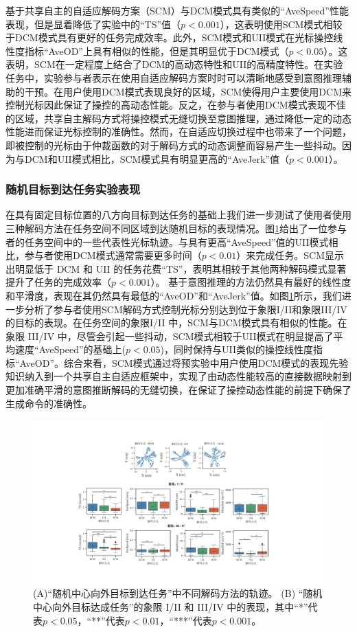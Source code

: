 基于共享自主的自适应解码方案（SCM）与DCM模式具有类似的``AveSpeed''性能表现，但是显着降低了实验中的``TS''值（$p<0.001$），这表明使用SCM模式相较于DCM模式具有更好的任务完成效率。此外，SCM模式和UII模式在光标操控线性度指标``AveOD''上具有相似的性能，但是其明显优于DCM模式（$p<0.05$）。这表明，SCM在一定程度上结合了DCM的高动态特性和UII的高精度特性。在实验任务中，实验参与者表示在使用自适应解码方案时时可以清晰地感受到意图推理辅助的干预。在用户使用DCM模式表现良好的区域，SCM使得用户主要使用DCM来控制光标因此保证了操控的高动态性能。反之，在参与者使用DCM模式表现不佳的区域，共享自主解码方式将操控模式无缝切换至意图推理，通过降低一定的动态性能进而保证光标控制的准确性。然而，在自适应切换过程中也带来了一个问题，即被控制的光标由于仲裁函数的对于解码方式的动态调整而容易产生一些抖动。因为与DCM和UII模式相比，SCM模式具有明显更高的``AveJerk''值（$p<0.001$）。  

\subsubsection{随机目标到达任务实验表现}在具有固定目标位置的八方向目标到达任务的基础上我们进一步测试了使用者使用三种解码方法在任务空间不同区域到达随机目标的表现情况。图\ref{fig:3-14}给出了一位参与者的任务空间中的一些代表性光标轨迹。与具有更高``AveSpeed''值的UII模式相比，参与者使用DCM模式通常需要更多时间（$p<0.01$）来完成任务。SCM显示出明显低于 DCM 和 UII 的任务花费``TS''，表明其相较于其他两种解码模式显著提升了任务的完成效率（$p<0.001$）。 基于意图推理的方法仍然具有最好的线性度和平滑度，表现在其仍然具有最低的``AveOD''和``AveJerk''值。如图\ref{fig:3-14}所示，我们进一步分析了参与者使用SCM解码方式控制光标分别达到位于象限I/II和象限III/IV的目标的表现。在任务空间的象限I/II 中，SCM与DCM模式具有相似的性能。在象限 III/IV 中，尽管会引起一些抖动，SCM模式相较于UII模式在明显提高了平均速度``AveSpeed''的基础上($p<0.05$)，同时保持与UII类似的操控线性度指标``AveOD''。综合来看，SCM模式通过将预实验中用户使用DCM模式的表现先验知识纳入到一个共享自主自适应框架中，实现了由动态性能较高的直接数据映射到更加准确平滑的意图推断解码的无缝切换，在保证了操控动态性能的前提下确保了生成命令的准确性。  

\begin{figure}[htb]
    \includegraphics[width=1\textwidth]{figures/3-Fig-14.pdf}
    \caption{(A)“随机中心向外目标到达任务”中不同解码方法的轨迹。 (B) “随机中心向外目标达成任务”的象限 I/II 和 III/IV 中的表现，其中“*”代表$p<0.05$，“**”代表$p<0.01$，“***”代表$p<0.001$。}
    \label{fig:3-14}
\end{figure}  

